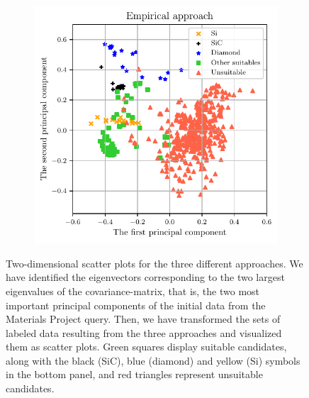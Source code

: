 \documentclass[superscriptaddress,unsortedaddress,
 amsmath,amssymb,
 aps,
]{revtex4-2}
\begin{document}
\begin{figure}
\begin{subfigure}{0.35\textwidth}
    \end{subfigure}
    \begin{subfigure}{0.4\textwidth}
        \centering
        \includegraphics[width=1\textwidth]{figures/pca-2d-plots/03-insightful-approach.pdf}
    \end{subfigure}
    \caption{Two-dimensional scatter plots for the three different approaches. We have identified the eigenvectors corresponding to the two largest eigenvalues of the covariance-matrix, that is, the two most important principal components of the initial data from the Materials Project query. Then, we have transformed the sets of labeled data resulting from the three approaches and visualized them as scatter plots. Green squares display suitable candidates, along with the black (SiC), blue (diamond) and yellow (Si) symbols in the bottom panel, and red triangles represent unsuitable candidates.}
    \label{fig:2dscatterplotpca}
\end{figure}
\end{document}
